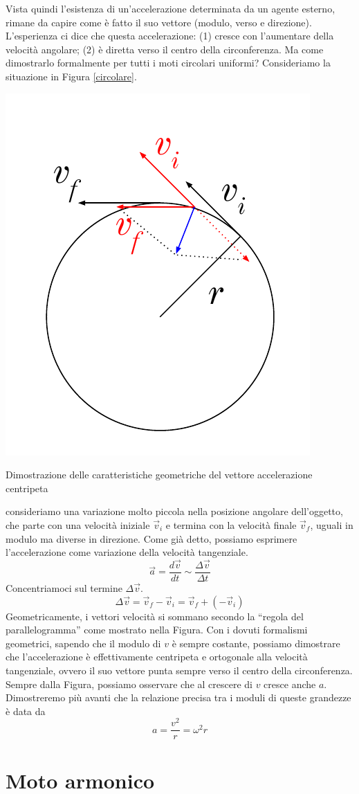 Vista quindi l'esistenza di un'accelerazione determinata da un agente esterno,
rimane da capire come è fatto il suo vettore (modulo, verso e direzione).
L'esperienza ci dice che questa accelerazione: (1) cresce con l'aumentare della
velocità angolare; (2) è diretta verso il centro della circonferenza. Ma come
dimostrarlo formalmente per tutti i moti circolari uniformi? Consideriamo la
situazione in Figura \ref{circolare}.
\begin{marginfigure}
    \centering
    \includegraphics[width = \marginparwidth]{figures/circolare.pdf}
    \caption{Dimostrazione delle caratteristiche geometriche del vettore accelerazione centripeta}
    \label{circolare}
\end{marginfigure}
consideriamo una variazione molto piccola nella posizione angolare dell'oggetto,
che parte con una velocità iniziale $\overrightarrow{v}_i$ e termina con la
velocità finale $\overrightarrow{v}_f$, uguali in modulo ma diverse in direzione.
Come già detto, possiamo esprimere l'accelerazione come variazione della
velocità tangenziale.
\[ \overrightarrow{a} = \frac{d\overrightarrow{v}}{dt} \sim \frac{\Delta\overrightarrow{v}}{\Delta t} \]
Concentriamoci sul termine $\Delta\overrightarrow{v}$.
\[ \Delta\overrightarrow{v} = \overrightarrow{v}_f - \overrightarrow{v}_i = \overrightarrow{v}_f + (-\overrightarrow{v}_i) \]
Geometricamente, i vettori velocità si sommano secondo la ``regola del parallelogramma''
come mostrato nella Figura. Con i dovuti formalismi geometrici, sapendo che il
modulo di $v$ è sempre costante, possiamo dimostrare che l'accelerazione è
effettivamente centripeta e ortogonale alla velocità tangenziale, ovvero il
suo vettore punta sempre verso il centro della circonferenza. Sempre dalla Figura,
possiamo osservare che al crescere di $v$ cresce anche $a$. Dimostreremo più
avanti che la relazione precisa tra i moduli di queste grandezze è data da
\[ a = \frac{v^2}{r} = \omega^2 r \]

\section{Moto armonico}



